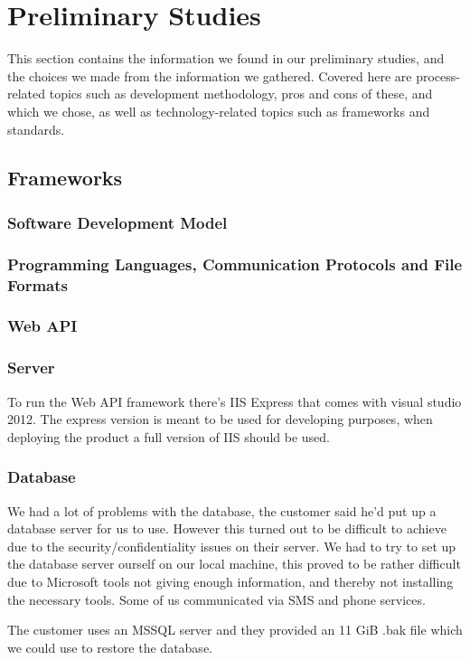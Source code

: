 \section{Preliminary Studies}
This section contains the information we found in our preliminary studies, and the choices we made from the information we gathered. Covered here are process-related topics such as development methodology, pros and cons of these, and which we chose, as well as technology-related topics such as frameworks and standards.


\newpage

\subsection{Frameworks}
\subsubsection{Software Development Model}
\subsubsection{Programming Languages, Communication Protocols and File Formats}
\subsubsection{Web API}
\subsubsection{Server}
To run the Web API framework there's IIS Express that comes with visual studio 2012. The express version is meant to be used for developing purposes, when deploying the product a full version of IIS should be used.
\subsubsection{Database}
We had a lot of problems with the database, the customer said he'd put up a database server for us to use. However this turned out to be difficult to achieve due to the security/confidentiality issues on their server. We had to try to set up the database server ourself on our local machine, this proved to be rather difficult due to Microsoft tools not giving enough information, and thereby not installing the necessary tools. Some of us communicated via SMS and phone services.

The customer uses an MSSQL server and they provided an 11 GiB .bak file which we could use to restore the database.

